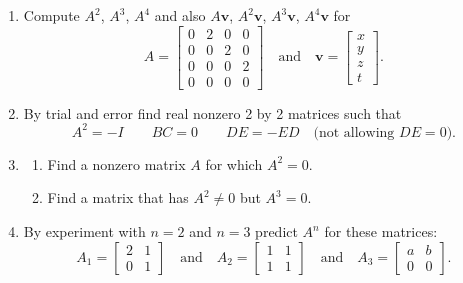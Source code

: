 \documentclass[14pt, a4paper]{article}
\begin{document}
\begin{enumerate}[resume]

    \item Compute $A^2$, $A^3$, $A^4$ and also $A\boldsymbol{v}$, $A^2\boldsymbol{v}$, $A^3\boldsymbol{v}$, $A^4\boldsymbol{v}$ for
          \[
              A = \begin{bmatrix}
                  0 & 2 & 0 & 0 \\
                  0 & 0 & 2 & 0 \\
                  0 & 0 & 0 & 2 \\
                  0 & 0 & 0 & 0
              \end{bmatrix}
              \quad\text{and}\quad
              \boldsymbol{v} = \begin{bmatrix} x \\ y \\ z \\ t \end{bmatrix}.
          \]

    \item By trial and error find real nonzero 2 by 2 matrices such that
          \[
              A^2 = -I \qquad BC = 0 \qquad DE = -ED \quad\text{(not allowing } DE = 0\text{)}.
          \]

    \item
          \begin{enumerate}
              \item Find a nonzero matrix $A$ for which $A^2 = 0$.
              \item Find a matrix that has $A^2 \ne 0$ but $A^3 = 0$.
          \end{enumerate}

    \item By experiment with $n=2$ and $n=3$ predict $A^n$ for these matrices:
          \[
              A_1 = \begin{bmatrix} 2 & 1 \\ 0 & 1 \end{bmatrix}
              \quad\text{and}\quad
              A_2 = \begin{bmatrix} 1 & 1 \\ 1 & 1 \end{bmatrix}
              \quad\text{and}\quad
              A_3 = \begin{bmatrix} a & b \\ 0 & 0 \end{bmatrix}.
          \]
\end{enumerate}
\end{document}

